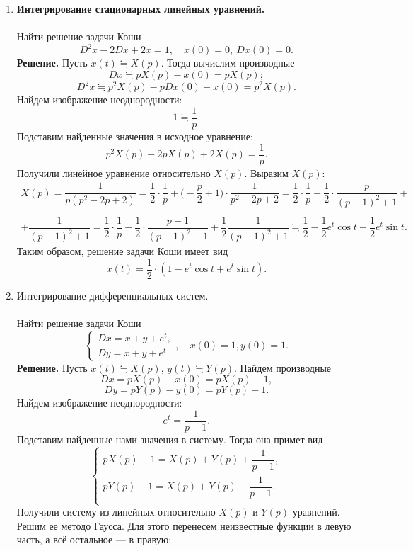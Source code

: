 \documentclass[a4paper, 12pt]{article}
\begin{document}
	\begin{enumerate}
		\item \textbf{Интегрирование стационарных линейных уравнений.}\\\\
		Найти решение задачи Коши $$D^2x - 2Dx + 2x = 1,\quad x(0) = 0,\ Dx(0) = 0.$$
		\textbf{Решение.} Пусть $x(t) \fallingdotseq X(p)$. Тогда вычислим производные $$Dx \fallingdotseq pX(p) - x(0) = pX(p);$$
		$$D^2x \fallingdotseq p^2X(p) - pDx(0) - x(0) = p^2X(p).$$
		Найдем изображение неоднородности:
		$$1 \fallingdotseq \dfrac{1}{p}.$$
		Подставим найденные значения в исходное уравнение:
		$$p^2X(p) - 2pX(p) + 2X(p) = \dfrac{1}{p}.$$
		Получили линейное уравнение относительно $X(p)$. Выразим $X(p)$:
		\begin{multline*}
		X(p) = \dfrac{1}{p(p^2 - 2p + 2)} = \dfrac{1}{2}\cdot \dfrac{1}{p} + \Big(-\dfrac{p}{2} + 1\Big)\cdot \dfrac{1}{p^2 - 2p + 2} = \dfrac{1}{2}\cdot \dfrac{1}{p} - \dfrac{1}{2}\cdot \dfrac{p}{(p-1)^2 + 1} +\\\\+ \dfrac{1}{(p-1)^2 + 1}  = \dfrac{1}{2}\cdot \dfrac{1}{p} - \dfrac{1}{2}\cdot \dfrac{p - 1}{(p-1)^2 + 1} + \dfrac{1}{2}\dfrac{1}{(p-1)^2 + 1} \fallingdotseq \dfrac{1}{2} - \dfrac{1}{2}e^t\cos t + \dfrac{1}{2}e^t\sin t.
 		\end{multline*}
		Таким образом, решение задачи Коши имеет вид $$x(t) = \dfrac{1}{2}\cdot (1 - e^t\cos t + e^t\sin t).$$
		\item Интегрирование дифференциальных систем.\\\\
		Найти решение задачи Коши $$\begin{cases}
			Dx = x + y + e^t,\\
			Dy = x + y + e^t
		\end{cases}, \quad x(0) = 1, y(0)=1.$$
		\textbf{Решение.} Пусть $x(t) \fallingdotseq X(p)$, $y(t) \fallingdotseq Y(p)$. Найдем производные $$Dx = pX(p) - x(0) = pX(p) - 1,$$
		$$Dy = pY(p)  - y(0) = pY(p) - 1.$$
		Найдем изображение неоднородности:
		$$e^t = \dfrac{1}{p -1}.$$
		Подставим найденные нами значения в систему. Тогда она примет вид $$\begin{cases}
			pX(p) - 1 = X(p) + Y(p) + \dfrac{1}{p -1},\\
			pY(p) - 1 = X(p) + Y(p) + \dfrac{1}{p -1}.\\
		\end{cases}$$
		Получили систему из линейных относительно $X(p)$ и $Y(p)$ уравнений. Решим ее методо Гаусса. Для этого перенесем неизвестные функции в левую часть, а всё остальное --- в правую:

\end{enumerate}
\end{document}
